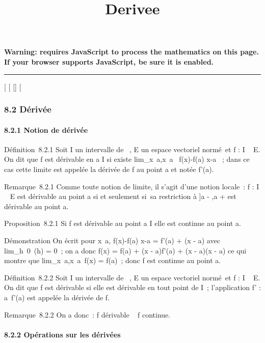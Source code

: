 \documentclass[]{article}
\title{Derivee}
\author{}
\date{}
\begin{document}
\maketitle

\textbf{Warning: 
requires JavaScript to process the mathematics on this page.\\ If your
browser supports JavaScript, be sure it is enabled.}

\begin{center}\rule{3in}{0.4pt}\end{center}

{[}
{[}
{[}{]}
{[}

\subsubsection{8.2 Dérivée}

\paragraph{8.2.1 Notion de dérivée}

Définition~8.2.1 Soit I un intervalle de ~, E un espace vectoriel
normé~et f : I \rightarrow~ E. On dit que f est dérivable en a \in I si existe
lim\_x\rightarrow~a,x\neq~a~
f(x)-f(a) \over x-a ~; dans ce cas cette limite est
appelée la dérivée de f au point a et notée f'(a).

Remarque~8.2.1 Comme toute notion de limite, il s'agit d'une notion
locale~: f : I \rightarrow~ E est dérivable au point a si et seulement si~sa
restriction à {]}a - \eta,a + \eta{[}\bigcapI est dérivable au point a.

Proposition~8.2.1 Si f est dérivable au point a \in I elle est continue au
point a.

Démonstration On écrit pour x\neq~a,  f(x)-f(a)
\over x-a = f'(a) + \epsilon(x - a) avec
lim\_h\rightarrow~0~\epsilon(h) = 0~; on a donc f(x) =
f(a) + (x - a)f'(a) + (x - a)\epsilon(x - a) ce qui montre que
lim\_x\rightarrow~a,x\neq~a~f(x)
= f(a)~; donc f est continue au point a.

Définition~8.2.2 Soit I un intervalle de ~, E un espace vectoriel
normé~et f : I \rightarrow~ E. On dit que f est dérivable si elle est dérivable en
tout point de I~; l'application f' : a\mapsto~f'(a)
est appelée la dérivée de f.

Remarque~8.2.2 On a donc~: f dérivable \rigtharrow~ f continue.

\paragraph{8.2.2 Opérations sur les dérivées}
\end{document}
